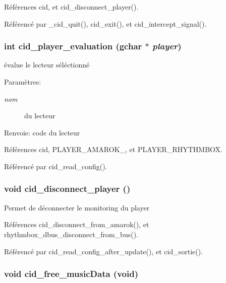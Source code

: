 Références cid, et cid\_\-disconnect\_\-player().

Référencé par \_\-cid\_\-quit(), cid\_\-exit(), et cid\_\-intercept\_\-signal().
\subsubsection{\setlength{\rightskip}{0pt plus 5cm}int cid\_\-player\_\-evaluation (gchar $\ast$ {\em player})}\label{cid-utilities_8c_6cad74bc450444838209d719a3a69cb1}


évalue le lecteur séléctionné \begin{Desc}
\item[Paramètres:]
\begin{description}
\item[{\em nom}]du lecteur \end{description}
\end{Desc}
\begin{Desc}
\item[Renvoie:]code du lecteur \end{Desc}


Références cid, PLAYER\_\-AMAROK\_, et PLAYER\_\-RHYTHMBOX.

Référencé par cid\_\-read\_\-config().
\subsubsection{\setlength{\rightskip}{0pt plus 5cm}void cid\_\-disconnect\_\-player ()}\label{cid-utilities_8c_f341249c88a564232783326fbb667a23}


Permet de déconnecter le monitoring du player 

Références cid\_\-disconnect\_\-from\_\-amarok(), et rhythmbox\_\-dbus\_\-disconnect\_\-from\_\-bus().

Référencé par cid\_\-read\_\-config\_\-after\_\-update(), et cid\_\-sortie().
\subsubsection{\setlength{\rightskip}{0pt plus 5cm}void cid\_\-free\_\-musicData (void)}\label{cid-utilities_8c_1fb8206b73ce7aa1aba3d8f6bebc8b5b}


